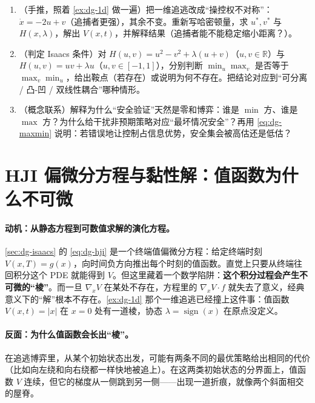 \begin{practice}
\begin{enumerate}
  \item （手推，照着 \cref{ex:dg-1d} 做一遍）把一维追逃改成“操控权不对称”：$\dot x=-2u+v$（追捕者更强），其余不变。重新写哈密顿量，求 $u^*,v^*$ 与 $H(x,\lambda)$，解出 $V(x,t)$，并解释结果（追捕者能不能稳定缩小距离？）。
  \item （判定 Isaacs 条件）对 $H(u,v)=u^2-v^2+\lambda(u+v)$（$u,v\in\mathbb{R}$）与 $H(u,v)=uv+\lambda u$（$u,v\in[-1,1]$），分别判断 $\min_u\max_v$ 是否等于 $\max_v\min_u$，给出鞍点（若存在）或说明为何不存在。把结论对应到“可分离 / 凸-凹 / 双线性耦合”哪种情形。
  \item （概念联系）解释为什么“安全验证”天然是零和博弈：谁是 $\min$ 方、谁是 $\max$ 方？为什么给干扰非预期策略对应“最坏情况安全”？再用 \cref{eq:dg-maxmin} 说明：若错误地让控制占信息优势，安全集会被高估还是低估？
\end{enumerate}
\end{practice}

\section{HJI 偏微分方程与黏性解：值函数为什么不可微}
\label{sec:dg-viscosity}

\paragraph{动机：从静态方程到可数值求解的演化方程。}
\cref{sec:dg-isaacs} 的 \cref{eq:dg-hji} 是一个终端值偏微分方程：给定终端时刻 $V(x,T)=g(x)$，向时间负方向推出每个时刻的值函数。直觉上只要从终端往回积分这个 PDE 就能得到 $V$。但这里藏着一个数学陷阱：\textbf{这个积分过程会产生不可微的“棱”}。而一旦 $\nabla_x V$ 在某处不存在，方程里的 $\nabla_x V\cdot f$ 就失去了意义，经典意义下的“解”根本不存在。\cref{ex:dg-1d} 那个一维追逃已经撞上这件事：值函数 $V(x,t)=|x|$ 在 $x=0$ 处有一道棱，协态 $\lambda=\operatorname{sign}(x)$ 在原点没定义。

\paragraph{反面：为什么值函数会长出“棱”。}
在追逃博弈里，从某个初始状态出发，可能有两条不同的最优策略给出相同的代价（比如向左绕和向右绕都一样快地被追上）。在这两类初始状态的分界面上，值函数 $V$ 连续，但它的梯度从一侧跳到另一侧——出现一道折痕，就像两个斜面相交的屋脊。

